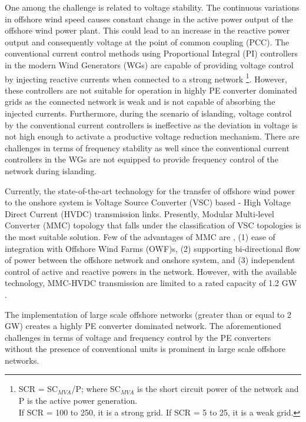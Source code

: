 One among the challenge is related to voltage stability. The continuous variations in offshore wind speed causes constant change in the active power output of the offshore wind power plant. This could lead to an increase in the reactive power output and consequently voltage at the point of common coupling (\gls{PCC}). The conventional current control methods using Proportional Integral (\gls{PI}) controllers in the modern Wind Generators (\gls{WG}s) are capable of providing voltage control by injecting reactive currents when connected to a strong network \footnote{SCR = SC$_{MVA}$/P;\; where SC$_{MVA}$ is the short circuit power of the network and P is the active power generation. \\
If SCR = 100 to 250, it is a strong grid. If SCR = 5 to 25, it is a weak grid.}. However, these controllers are not suitable for operation in highly \gls{PE} converter dominated grids as the connected network is weak and is not capable of absorbing the injected currents. Furthermore, during the scenario of islanding, voltage control by the conventional current controllers is ineffective as the deviation in voltage is not high enough to activate a productive voltage reduction mechanism. There are challenges in terms of frequency stability  as well since the conventional current controllers in the \gls{WG}s are not equipped to provide frequency control of the network during islanding. 

Currently, the state-of-the-art technology for the transfer of offshore wind power to the onshore system is Voltage Source Converter (\gls{VSC}) based  - High Voltage Direct Current (\gls{HVDC}) transmission links. Presently, Modular Multi-level Converter (\gls{MMC}) topology that falls under the classification of \gls{VSC} topologies is the most suitable solution. Few of the advantages of \gls{MMC} are \cite{cigre_B455}, (1) ease of integration with Offshore Wind Farms (\gls{OWF})s, (2) supporting bi-directional flow of power between the offshore network and onshore system, and (3) independent control of active and reactive powers in the network. However, with the available technology, \gls{MMC}-\gls{HVDC} transmission are limited to a rated capacity of 1.2 GW \cite{peralta2012detailed}.

The implementation of large scale offshore networks (greater than or equal to 2 GW) creates a highly \gls{PE} converter dominated network. The aforementioned challenges in terms of voltage and frequency control by the \gls{PE} converters without the presence of conventional units is prominent in large scale offshore networks. 

